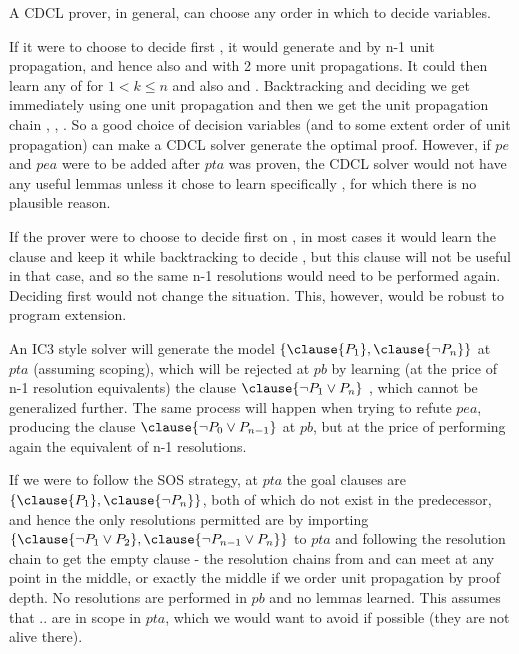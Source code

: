 \noindent
A CDCL prover, in general, can choose any order in which to decide variables. 

If it were to choose to decide first , it would generate  and  by n-1 unit propagation, and hence also  and  with 2 more unit propagations. It could then learn any of  for $1<k\leq n$ and also  and .
Backtracking and deciding  we get  immediately using one unit propagation and then we get the unit propagation chain , , . So a good choice of decision variables (and to some extent order of unit propagation) can make a CDCL solver generate the optimal proof. However, if $pe$ and $pea$ were to be added after $pta$ was proven, the CDCL solver would not have any useful lemmas unless it chose to learn specifically , for which there is no plausible reason.

If the prover were to choose to decide first on , in most cases it would learn the clause  and keep it while backtracking to decide , but this clause will not be useful in that case, and so the same n-1 resolutions would need to be performed again. Deciding first  would not change the situation. This, however, would be robust to program extension.

\noindent
An IC3 style solver will generate the model $\{ \clause{P_1}, \clause{\lnot P_n} \}$ at $pta$ (assuming scoping), which will be rejected at $pb$ by learning (at the price of n-1 resolution equivalents) the clause $\clause{\lnot P_1 \lor P_n}$ , which cannot be generalized further.
The same process will happen when trying to refute $pea$, producing  the clause $\clause{\lnot P_0 \lor P_{n-1}}$ at $pb$, but at the price of performing again the equivalent of n-1 resolutions.

\noindent

If we were to follow the SOS strategy, at $pta$ the goal clauses are $\{ \clause{P_1}, \clause{\lnot P_n} \}$, both of which do not exist in the predecessor, and hence the only resolutions permitted are by importing \\
$\{ \clause{\lnot P_1 \lor P_2}, \clause{\lnot P_{n-1} \lor P_n} \}$ to $pta$ and following the resolution chain to get the empty clause - the resolution chains from  and  can meet at any point in the middle, or exactly the middle if we order unit propagation by proof depth. No resolutions are performed in $pb$ and no lemmas learned. This assumes that .. are in scope in $pta$, which we would want to avoid if possible (they are not alive there).

